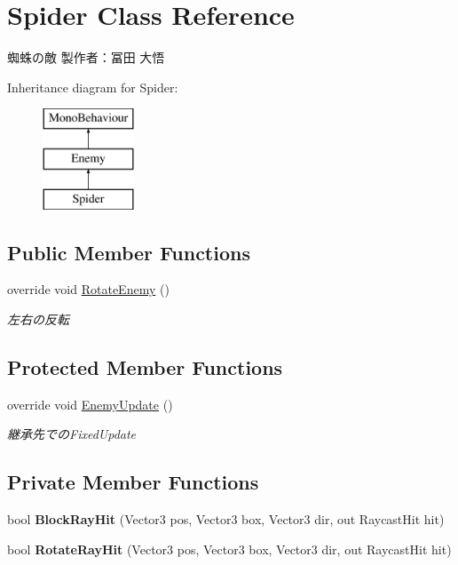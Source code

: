\hypertarget{class_spider}{}\section{Spider Class Reference}
\label{class_spider}


蜘蛛の敵 製作者：冨田 大悟  


Inheritance diagram for Spider\+:\begin{figure}[H]
\begin{center}
\leavevmode
\includegraphics[height=3.000000cm]{class_spider}
\end{center}
\end{figure}
\subsection*{Public Member Functions}
\begin{DoxyCompactItemize}
\item 
override void \hyperlink{class_spider_aeddc709039ca9a096e53ecc0dd0d3f84}{Rotate\+Enemy} ()
\begin{DoxyCompactList}\small\item\em 左右の反転 \end{DoxyCompactList}\end{DoxyCompactItemize}
\subsection*{Protected Member Functions}
\begin{DoxyCompactItemize}
\item 
override void \hyperlink{class_spider_a343565aa379615a2602907dd25137ed9}{Enemy\+Update} ()
\begin{DoxyCompactList}\small\item\em 継承先での\+Fixed\+Update \end{DoxyCompactList}\end{DoxyCompactItemize}
\subsection*{Private Member Functions}
\begin{DoxyCompactItemize}
\item 
\mbox{\label{class_spider_ac9f6152827be687113e193a616140313}} 
bool {\bfseries Block\+Ray\+Hit} (Vector3 pos, Vector3 box, Vector3 dir, out Raycast\+Hit hit)
\item 
\mbox{\label{class_spider_a1ad26b223680ddf157385da478a7c276}} 
bool {\bfseries Rotate\+Ray\+Hit} (Vector3 pos, Vector3 box, Vector3 dir, out Raycast\+Hit hit)
\end{DoxyCompactItemize}
